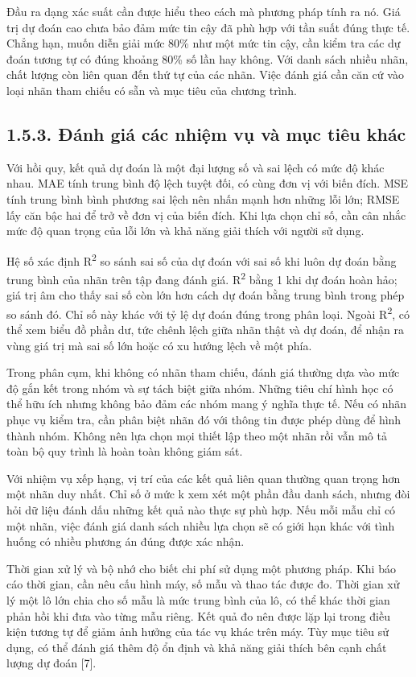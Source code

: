 Đầu ra dạng xác suất cần được hiểu theo cách mà phương pháp tính ra nó. Giá trị dự đoán cao chưa bảo đảm mức tin cậy đã phù hợp với tần suất đúng thực tế. Chẳng hạn, muốn diễn giải mức 80\% như một mức tin cậy, cần kiểm tra các dự đoán tương tự có đúng khoảng 80\% số lần hay không. Với danh sách nhiều nhãn, chất lượng còn liên quan đến thứ tự của các nhãn. Việc đánh giá cần căn cứ vào loại nhãn tham chiếu có sẵn và mục tiêu của chương trình.


\subsection{1.5.3. Đánh giá các nhiệm vụ và mục tiêu khác}

Với hồi quy, kết quả dự đoán là một đại lượng số và sai lệch có mức độ khác nhau. MAE tính trung bình độ lệch tuyệt đối, có cùng đơn vị với biến đích. MSE tính trung bình bình phương sai lệch nên nhấn mạnh hơn những lỗi lớn; RMSE lấy căn bậc hai để trở về đơn vị của biến đích. Khi lựa chọn chỉ số, cần cân nhắc mức độ quan trọng của lỗi lớn và khả năng giải thích với người sử dụng.


Hệ số xác định R\textsuperscript{2} so sánh sai số của dự đoán với sai số khi luôn dự đoán bằng trung bình của nhãn trên tập đang đánh giá. R\textsuperscript{2} bằng 1 khi dự đoán hoàn hảo; giá trị âm cho thấy sai số còn lớn hơn cách dự đoán bằng trung bình trong phép so sánh đó. Chỉ số này khác với tỷ lệ dự đoán đúng trong phân loại. Ngoài R\textsuperscript{2}, có thể xem biểu đồ phần dư, tức chênh lệch giữa nhãn thật và dự đoán, để nhận ra vùng giá trị mà sai số lớn hoặc có xu hướng lệch về một phía.


Trong phân cụm, khi không có nhãn tham chiếu, đánh giá thường dựa vào mức độ gắn kết trong nhóm và sự tách biệt giữa nhóm. Những tiêu chí hình học có thể hữu ích nhưng không bảo đảm các nhóm mang ý nghĩa thực tế. Nếu có nhãn phục vụ kiểm tra, cần phân biệt nhãn đó với thông tin được phép dùng để hình thành nhóm. Không nên lựa chọn mọi thiết lập theo một nhãn rồi vẫn mô tả toàn bộ quy trình là hoàn toàn không giám sát.


Với nhiệm vụ xếp hạng, vị trí của các kết quả liên quan thường quan trọng hơn một nhãn duy nhất. Chỉ số ở mức k xem xét một phần đầu danh sách, nhưng đòi hỏi dữ liệu đánh dấu những kết quả nào thực sự phù hợp. Nếu mỗi mẫu chỉ có một nhãn, việc đánh giá danh sách nhiều lựa chọn sẽ có giới hạn khác với tình huống có nhiều phương án đúng được xác nhận.


Thời gian xử lý và bộ nhớ cho biết chi phí sử dụng một phương pháp. Khi báo cáo thời gian, cần nêu cấu hình máy, số mẫu và thao tác được đo. Thời gian xử lý một lô lớn chia cho số mẫu là mức trung bình của lô, có thể khác thời gian phản hồi khi đưa vào từng mẫu riêng. Kết quả đo nên được lặp lại trong điều kiện tương tự để giảm ảnh hưởng của tác vụ khác trên máy. Tùy mục tiêu sử dụng, có thể đánh giá thêm độ ổn định và khả năng giải thích bên cạnh chất lượng dự đoán [7].


